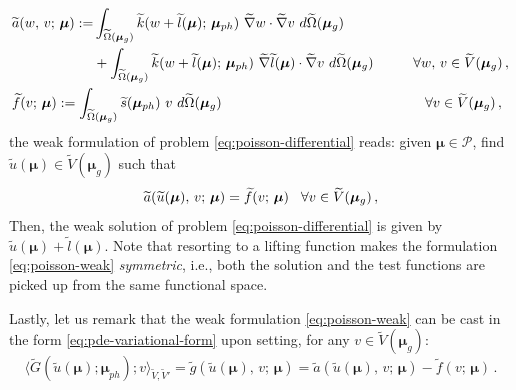 \documentclass[12pt, a4paper, twoside, openright]{report}
\numberwithin{equation}{chapter}
\theoremstyle{theorem}
\theoremstyle{definition}
\theoremstyle{remark}
\theoremstyle{proposition}
\numberwithin{figure}{chapter}
\newcommand{\wt}[1]{\widetilde{#1}}
\newcommand{\bg}[1]{\boldsymbol{#1}}
\begin{document}
		\begin{subequations}
			\label{eq:poisson-weak-forms}
			\begin{align}
				&
				\begin{aligned}
				\wt{a}(w, \, v; \, \bg{\mu}) := & \int_{\wt{\Omega}(\bg{\mu}_g)} \wt{k}(w + \wt{l}(\bg{\mu}); \, \bg{\mu}_{ph}) ~ \wt{\nabla} w \cdot \wt{\nabla} v ~ d\wt{\Omega}(\bg{\mu}_g) \\
				& + \int_{\wt{\Omega}(\bg{\mu}_g)} \wt{k}(w + \wt{l}(\bg{\mu}); \, \bg{\mu}_{ph}) ~ \wt{\nabla} \wt{l}(\bg{\mu}) \cdot \wt{\nabla} v ~ d\wt{\Omega}(\bg{\mu}_g) \hspace*{1cm} \forall w, \, v \in \wt{V}(\bg{\mu}_g) \, , 
				\end{aligned} \\
				& \wt{f}(v; \, \bg{\mu}) := \int_{\wt{\Omega}(\bg{\mu}_g)} \wt{s}(\bg{\mu}_{ph}) ~ v ~ d\wt{\Omega}(\bg{\mu}_g) \hspace*{1cm} \hspace*{4.125cm} \forall v \in \wt{V}(\bg{\mu}_g) \, ,
			\end{align}
		\end{subequations}
		the weak formulation of problem \eqref{eq:poisson-differential} reads: given $\bg{\mu} \in \mathcal{P}$, find $\wt{u}(\bg{\mu}) \in \wt{V}(\bg{\mu}_g)$ such that
		\begin{equation}
			\label{eq:poisson-weak}
			\wt{a}(\wt{u}(\bg{\mu}), \, v; \, \bg{\mu}) = \wt{f}(v; \, \bg{\mu}) \hspace*{0.3cm} \forall v \in \wt{V}(\bg{\mu}_g) \, , 
		\end{equation}
		Then, the weak solution of problem \eqref{eq:poisson-differential} is given by $\wt{u}(\bg{\mu}) + \wt{l}(\bg{\mu})$. Note that resorting to a lifting function makes the formulation \eqref{eq:poisson-weak} \emph{symmetric}, i.e., both the solution and the test functions are picked up from the same functional space.
		
		Lastly, let us remark that the weak formulation \eqref{eq:poisson-weak} can be cast in the form \eqref{eq:pde-variational-form} upon setting, for any $v \in \wt{V}(\bg{\mu}_g)$:
			\begin{equation*}
				\langle \wt{G}(\wt{u}(\bg{\mu}); \bg{\mu}_{ph}); v \rangle_{\wt{V},\wt{V}'} = \wt{g}(\wt{u}(\bg{\mu}), \, v; \, \bg{\mu}) = \wt{a}(\wt{u}(\bg{\mu}), \, v; \, \bg{\mu}) - \wt{f}(v; \, \bg{\mu}) \, .
			\end{equation*}
			
	\vspace*{0.3cm}
		
\end{document}
